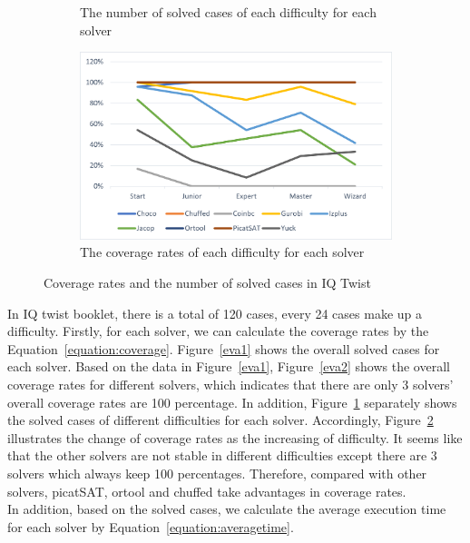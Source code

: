 \begin{figure}[htbp]
\begin{subfigure}[b]{0.48\textwidth}
    \caption{The number of solved cases of each difficulty for each solver}
    \label{eva3}
    \end{subfigure}
    \begin{subfigure}[b]{0.48\textwidth}
    \includegraphics[width=\textwidth]{figs/separated coverage.png}
    \caption{The coverage rates of each difficulty for each solver}
    \label{eva4}
    \end{subfigure}
    \caption{Coverage rates and the number of solved cases in IQ Twist}
    \label{fig:comparisonIQtwist}
\end{figure}
In IQ twist booklet, there is a total of 120 cases, every 24 cases make up a difficulty.
Firstly, for each solver, we can calculate the coverage rates by the Equation~\ref{equation:coverage}.
Figure~\ref{eva1} shows the overall solved cases for each solver. Based on the data in Figure~\ref{eva1}, Figure~\ref{eva2} shows the overall coverage rates for different solvers, which indicates that there are only 3 solvers' overall coverage rates are 100 percentage. In addition, Figure~\ref{eva3} separately shows the solved cases of different difficulties for each solver. Accordingly, Figure~\ref{eva4} illustrates the change of coverage rates as the increasing of difficulty. It seems like that the other solvers are not stable in different difficulties except there are 3 solvers which always keep 100 percentages. Therefore, compared with other solvers, picatSAT, ortool and chuffed take advantages in coverage rates.
\\In addition, based on the solved cases, we calculate the average execution time for each solver by Equation~\ref{equation:averagetime}.
